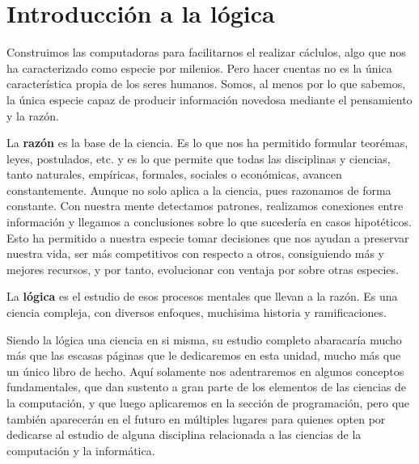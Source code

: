 \newcommand{\apple}{\emoji{unidades/3_logica/1_logica/imagenes/apple.pdf}}
\newcommand{\orange}{\emoji{unidades/3_logica/1_logica/imagenes/orange.pdf}}


\chapter{Introducción a la lógica}
\label{chap:logica}

Construimos las computadoras para facilitarnos el realizar cáclulos, algo que
nos ha caracterizado como especie por milenios. Pero hacer cuentas no es la
única característica propia de los seres humanos. Somos, al menos por lo que
sabemos, la única especie capaz de producir información novedosa mediante el
pensamiento y la razón.

La \textbf{razón} es la base de la ciencia. Es lo que nos ha
permitido formular teorémas, leyes, postulados, etc. y es lo que permite que
todas las disciplinas y ciencias, tanto naturales, empíricas, formales, sociales
o económicas, avancen constantemente. Aunque no solo aplica a la ciencia, pues
razonamos de forma constante. Con nuestra mente detectamos patrones, realizamos
conexiones entre información y llegamos a conclusiones sobre lo que sucedería en
casos hipotéticos. Esto ha permitido a nuestra especie tomar decisiones que nos
ayudan a preservar nuestra vida, ser más competitivos con respecto a otros,
consiguiendo más y mejores recursos, y por tanto, evolucionar con ventaja por
sobre otras especies.

La \textbf{lógica} es el estudio de esos procesos mentales
que llevan a la razón. Es una ciencia compleja, con diversos enfoques, muchisima
historia y ramificaciones.

Siendo la lógica una ciencia en si misma, su estudio completo abaracaría mucho
más que las escasas páginas que le dedicaremos en esta unidad, mucho más que un
único libro de hecho. Aquí solamente nos adentraremos en algunos conceptos
fundamentales, que dan sustento a gran parte de los elementos de las ciencias de
la computación, y que luego aplicaremos en la sección de programación, pero que
también aparecerán en el futuro en múltiples lugares para quienes opten por
dedicarse al estudio de alguna disciplina relacionada a las ciencias de la
computación y la informática.

